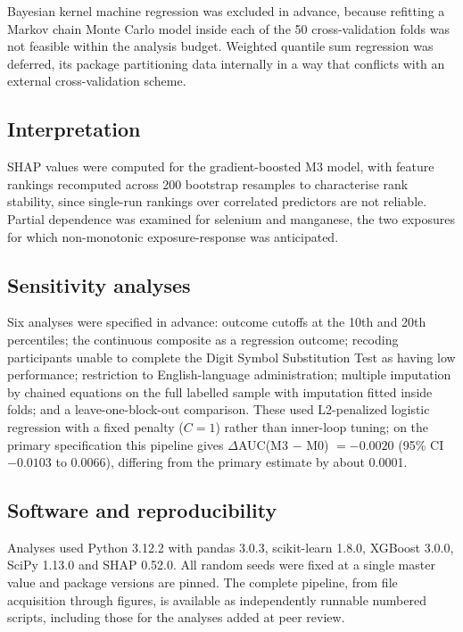 \documentclass[12pt]{article}
\newcommand{\deltaauc}{$\Delta$AUC}
\begin{document}
Bayesian kernel machine regression was excluded in advance, because refitting a Markov chain Monte Carlo model inside each of the 50 cross-validation folds was not feasible within the analysis budget. Weighted quantile sum regression was deferred, its package partitioning data internally in a way that conflicts with an external cross-validation scheme.

\subsection*{Interpretation}

SHAP values were computed for the gradient-boosted M3 model, with feature rankings recomputed across 200 bootstrap resamples to characterise rank stability, since single-run rankings over correlated predictors are not reliable. Partial dependence was examined for selenium and manganese, the two exposures for which non-monotonic exposure-response was anticipated.

\subsection*{Sensitivity analyses}

Six analyses were specified in advance: outcome cutoffs at the 10th and 20th percentiles; the continuous composite as a regression outcome; recoding participants unable to complete the Digit Symbol Substitution Test as having low performance; restriction to English-language administration; multiple imputation by chained equations on the full labelled sample with imputation fitted inside folds; and a leave-one-block-out comparison. These used L2-penalized logistic regression with a fixed penalty ($C = 1$) rather than inner-loop tuning; on the primary specification this pipeline gives \deltaauc(M3 $-$ M0) $= -0.0020$ (95\% CI $-0.0103$ to $0.0066$), differing from the primary estimate by about 0.0001.

\subsection*{Software and reproducibility}

Analyses used Python 3.12.2 with pandas 3.0.3, scikit-learn 1.8.0, XGBoost 3.0.0, SciPy 1.13.0 and SHAP 0.52.0. All random seeds were fixed at a single master value and package versions are pinned. The complete pipeline, from file acquisition through figures, is available as independently runnable numbered scripts, including those for the analyses added at peer review.
\end{document}
